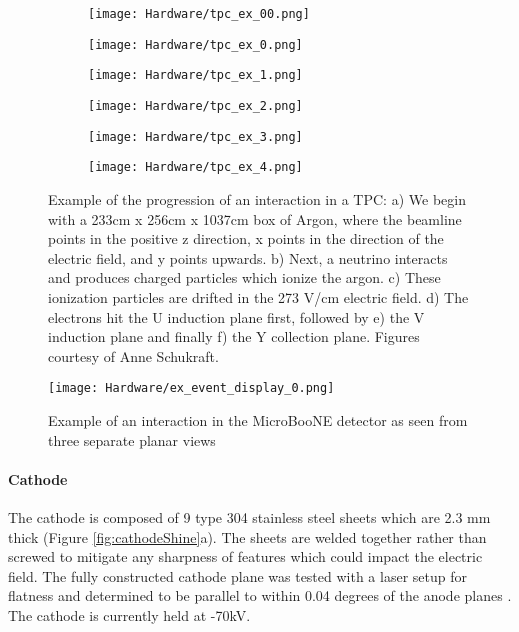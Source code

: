 \begin{figure}[H]
\centering
  \begin{subfigure}[t]{0.3\textwidth}
    \centering
\texttt{[image: Hardware/tpc\_ex\_00.png]}
  \caption{ }
  \end{subfigure} 
  \begin{subfigure}[t]{0.3\textwidth}
    \centering
\texttt{[image: Hardware/tpc\_ex\_0.png]}
  \caption{ }
  \end{subfigure} 
  \begin{subfigure}[t]{0.3\textwidth}
    \centering
\texttt{[image: Hardware/tpc\_ex\_1.png]}
  \caption{ }
  \end{subfigure} 
    \begin{subfigure}[t]{0.3\textwidth}
    \centering
\texttt{[image: Hardware/tpc\_ex\_2.png]}
  \caption{ }
  \end{subfigure} 
  \begin{subfigure}[t]{0.3\textwidth}
    \centering
\texttt{[image: Hardware/tpc\_ex\_3.png]}
  \caption{ }
  \end{subfigure} 
  \begin{subfigure}[t]{0.25\textwidth}
    \centering
\texttt{[image: Hardware/tpc\_ex\_4.png]}
  \caption{ }
  \end{subfigure} 

\caption{ Example of the progression of an interaction in a TPC: a) We begin with a 233cm x 256cm x 1037cm box of Argon, where the beamline points in the positive z direction, x points in the direction of the electric field, and y points upwards.  b) Next, a neutrino interacts and produces charged particles which ionize the argon. c) These ionization particles are drifted in the 273 V/cm electric field. d) The electrons hit the U induction plane first, followed by e) the V induction plane and finally f) the Y collection plane. Figures courtesy of Anne Schukraft.}
\label{fig:ex_tpc_event_progression}
\end{figure}


\begin{figure}[H]
\centering
\texttt{[image: Hardware/ex\_event\_display\_0.png]}

\caption{ Example of an interaction in the MicroBooNE detector as seen from three separate planar views }
\label{fig:ex_tpc_event}
\end{figure}



\paragraph{Cathode} 
\par The cathode is composed of 9 type 304 stainless steel sheets which are 2.3 mm thick (Figure \ref{fig:cathodeShine}a).  The sheets are welded together rather than screwed to mitigate any sharpness of features which could impact the electric field. The fully constructed cathode plane was tested with a laser setup for flatness and determined to be parallel to within 0.04 degrees of the anode planes \cite{bib:uboone_JINST} . The cathode is currently held at -70kV.  


